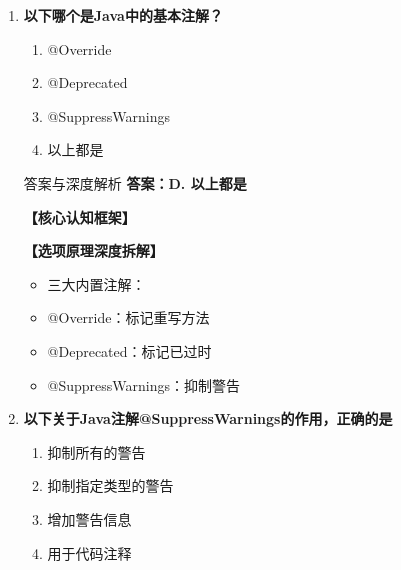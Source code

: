 \documentclass[12pt, a4paper]{ctexart}
\begin{document}
\begin{enumerate}[label=\textbf{\arabic*.}]
\begin{bluebox}{答案与深度解析}
\begin{itemize}[label={}, leftmargin=*, nosep]
\begin{itemize}[label={}, nosep]
					  \end{itemize}
		      \item \textbf{D. 注解可以为代码添加额外的信息 — 正确}
					  \begin{itemize}[label={}, nosep]
		      
			      \item 这是注解的主要作用
		      
		      

	      
					  \end{itemize}
					  \end{itemize}
\end{bluebox}

	      \vspace{1em}

	\item \textbf{以下哪个是Java中的基本注解？}
	      \begin{enumerate}[label=\Alph*.]
		      \item @Override
		      \item @Deprecated
		      \item @SuppressWarnings
		      \item 以上都是
	      \end{enumerate}

	      \begin{bluebox}{答案与深度解析}
		      \textbf{答案：D. 以上都是}

		      \textbf{【核心认知框架】}

		      \textbf{【选项原理深度拆解】}
					  \begin{itemize}[label={}, leftmargin=*, nosep]


		      \item[] 三大内置注解：
		      
			      \item @Override：标记重写方法
			      \item @Deprecated：标记已过时
			      \item @SuppressWarnings：抑制警告
		      
	      
					  \end{itemize}
\end{bluebox}

	      \vspace{1em}

	\item \textbf{以下关于Java注解@SuppressWarnings的作用，正确的是}
	      \begin{enumerate}[label=\Alph*.]
		      \item 抑制所有的警告
		      \item 抑制指定类型的警告
		      \item 增加警告信息
		      \item 用于代码注释
	      \end{enumerate}


\end{enumerate}
\end{document}
